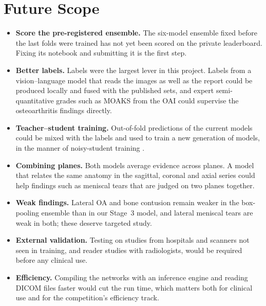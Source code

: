 \section{Future Scope}

\begin{itemize}[leftmargin=1.4em]
\item \textbf{Score the pre-registered ensemble.} The six-model ensemble fixed before the last folds were trained has not yet been scored on the private leaderboard. Fixing its notebook and submitting it is the first step.
\item \textbf{Better labels.} Labels were the largest lever in this project. Labels from a vision--language model that reads the images as well as the report could be produced locally and fused with the published sets, and expert semi-quantitative grades such as MOAKS \cite{hunter2011moaks} from the OAI could supervise the osteoarthritis findings directly.
\item \textbf{Teacher--student training.} Out-of-fold predictions of the current models could be mixed with the labels and used to train a new generation of models, in the manner of noisy-student training \cite{xie2020noisystudent}.
\item \textbf{Combining planes.} Both models average evidence across planes. A model that relates the same anatomy in the sagittal, coronal and axial series could help findings such as meniscal tears that are judged on two planes together.
\item \textbf{Weak findings.} Lateral OA and bone contusion remain weaker in the box-pooling ensemble than in our Stage~3 model, and lateral meniscal tears are weak in both; these deserve targeted study.
\item \textbf{External validation.} Testing on studies from hospitals and scanners not seen in training, and reader studies with radiologists, would be required before any clinical use.
\item \textbf{Efficiency.} Compiling the networks with an inference engine and reading DICOM files faster would cut the run time, which matters both for clinical use and for the competition's efficiency track.
\end{itemize}
